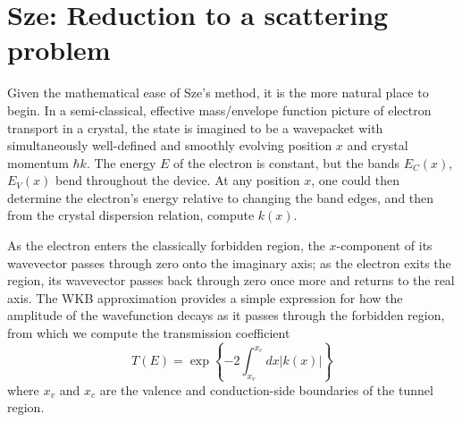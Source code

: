 \section{Sze: Reduction to a scattering problem}
Given the mathematical ease of Sze's method, it is the more natural place to begin. In a semi-classical, effective mass/envelope function picture of electron transport in a crystal, the state is imagined to be a wavepacket with simultaneously well-defined and smoothly evolving position $x$ and crystal momentum $\hbar k$.  The energy $E$ of the electron is constant, but the bands $E_C(x)$, $E_V(x)$ bend throughout the device.  At any position $x$, one could then determine the electron's energy relative to changing the band edges, and then from the crystal dispersion relation, compute $k(x)$.

As the electron enters the classically forbidden region, the $x$-component of its wavevector passes through zero onto the imaginary axis; as the electron exits the region, its wavevector passes back through zero once more and returns to the real axis.  The WKB approximation provides a simple expression for how the amplitude of the wavefunction decays as it passes through the forbidden region, from which we compute the transmission coefficient
$$T(E)=\exp\left\{-2\int_{x_v}^{x_c}dx|k(x)|\right\}$$
where $x_v$ and $x_c$ are the valence and conduction-side boundaries of the tunnel region.